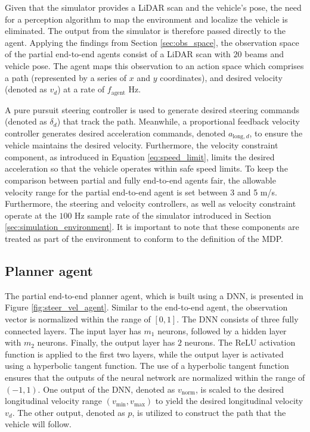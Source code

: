 Given that the simulator provides a LiDAR scan and the vehicle's pose, the need for a perception algorithm to map the environment and localize the vehicle is eliminated. 
The output from the simulator is therefore passed directly to the agent.
Applying the findings from Section \ref{sec:obs_space}, the observation space of the partial end-to-end agents consist of a LiDAR scan with $20$ beams and vehicle pose.
The agent maps this observation to an action space which comprises a path (represented by a series of $x$ and $y$ coordinates), and desired velocity (denoted as $v_{d}$) at a rate of $f_{\text{agent}}$ Hz. 


A pure pursuit steering controller is used to generate desired steering commands (denoted as $\delta_{d}$) that track the path.
Meanwhile, a proportional feedback velocity controller generates desired acceleration commands, denoted $a_{\text{long},d}$, to ensure the vehicle maintains the desired velocity.
Furthermore, the velocity constraint component, as introduced in Equation \ref{eq:speed_limit}, limits the desired acceleration so that the vehicle operates within safe speed limits. 
To keep the comparison between partial and fully end-to-end agents fair, the allowable velocity range for the partial end-to-end agent is set between 3 and 5 m/s.
Furthermore, the steering and velocity controllers, as well as velocity constraint operate at the $100$ Hz sample rate of the simulator introduced in Section \ref{sec:simulation_environment}.
It is important to note that these components are treated as part of the environment to conform to the definition of the MDP. 

\subsection{Planner agent}

The partial end-to-end planner agent, which is built using a DNN, is presented in Figure \ref{fig:steer_vel_agent}. 
Similar to the end-to-end agent, the observation vector is normalized within the range of $[0,1]$.
The DNN consists of three fully connected layers. The input layer has $m_1$ neurons, followed by a hidden layer with $m_2$ neurons. Finally, the output layer has $2$ neurons. 
The ReLU activation function is applied to the first two layers, while the output layer is activated using a hyperbolic tangent function. 
The use of a hyperbolic tangent function ensures that the outputs of the neural network are normalized within the range of $(-1, 1)$.
One output of the DNN, denoted as $v_{\text{norm}}$, is scaled to the desired longitudinal velocity range $(v_{\text{min}}, v_{\text{max}})$ to yield the desired longitudinal velocity $v_{d}$. 
The other output, denoted as $p$, is utilized to construct the path that the vehicle will follow.


